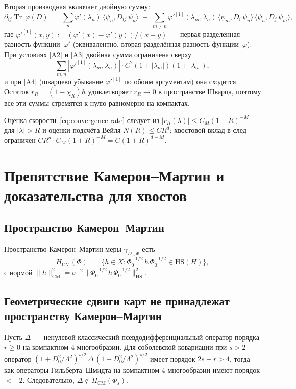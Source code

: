 \documentclass[12pt,a4paper]{article}
\theoremstyle{plain}
\theoremstyle{definition}
\theoremstyle{remark}
\newcommand{\Tr}{\operatorname{Tr}}
\newcommand{\HS}{\mathrm{HS}}
\newcommand{\Lam}{\Lambda}
\begin{document}
Вторая производная включает двойную сумму:
\begin{equation}
  \partial_{ij}\Tr\,\varphi(D) \;=\;
  \sum_n \varphi'(\lambda_n)\,\langle\psi_n, D_{ij}\,\psi_n\rangle
  \;+\;
  \sum_{m \ne n} \varphi'^{[1]}(\lambda_m,\lambda_n)\,
  \langle\psi_m, D_i\,\psi_n\rangle\,
  \langle\psi_n, D_j\,\psi_m\rangle,
\end{equation}
где $\varphi'^{[1]}(x,y) := (\varphi'(x)-\varphi'(y))/(x-y)$~--- первая
разделённая разность функции~$\varphi'$ (эквивалентно, вторая
разделённая разность функции~$\varphi$).  При условиях \ref{A2} и \ref{A3} двойная сумма
ограничена сверху
\[
  \sum_{m,n} |\varphi'^{[1]}(\lambda_m,\lambda_n)|\cdot
  C^2(1+|\lambda_m|)(1+|\lambda_n|),
\]
и при \ref{A4} (шварцево убывание $\varphi'^{[1]}$ по обоим аргументам)
она сходится.  Остаток $r_R = (1-\chi_R)h$ удовлетворяет
$r_R \to 0$ в пространстве Шварца, поэтому все эти суммы стремятся
к нулю равномерно на компактах.

Оценка скорости~\eqref{eq:convergence-rate} следует из
$|r_R(\lambda)| \le C_M(1+R)^{-M}$ для $|\lambda| > R$ и оценки
подсчёта Вейля $N(R) \le C R^d$: хвостовой вклад в след ограничен
$C R^d \cdot C_M(1+R)^{-M} = C(1+R)^{d-M}$.


\section{Препятствие Камерон--Мартин и доказательства для хвостов}
\label{app:cameron-martin}

\subsection{Пространство Камерон--Мартин}

Пространство Камерон--Мартин меры $\gamma_{D_0,\Phi}$ есть
\begin{equation}
  H_{\mathrm{CM}}(\Phi)
  \;=\;
  \bigl\{h \in X : \Phi_0^{-1/2}\,h\,\Phi_0^{-1/2} \in \HS(H)\bigr\},
\end{equation}
с нормой $\|h\|_{\mathrm{CM}}^2 = \sigma^{-2}
\|\Phi_0^{-1/2}\,h\,\Phi_0^{-1/2}\|_{\HS}^2$.

\subsection{Геометрические сдвиги карт не принадлежат пространству Камерон--Мартин}

Пусть $\Delta$~--- ненулевой классический псевдодифференциальный
оператор порядка $r \ge 0$ на компактном 4-многообразии.
Для соболевской ковариации при $s > 2$ оператор
$(1+D_0^2/\Lam^2)^{s/2}\,\Delta\,(1+D_0^2/\Lam^2)^{s/2}$ имеет
порядок $2s + r > 4$, тогда как операторы Гильберта--Шмидта на
компактном 4-многообразии имеют порядок $< -2$.  Следовательно,
$\Delta \notin H_{\mathrm{CM}}(\Phi_s)$.
\end{document}
